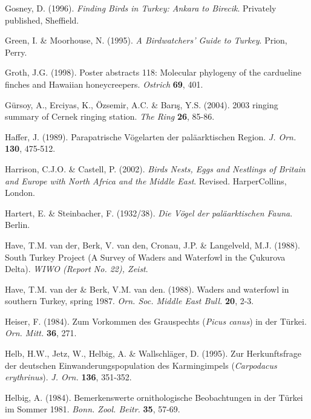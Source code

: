 \documentclass[
  10.5pt,
  a4paper,
  DIV=11,
  numbers=noendperiod,
  twocolumn]{scrreprt}
\newlength{\cslhangindent}
\newenvironment{CSLReferences}[2] %
 {\begin{list}{}{%
  \setlength{\itemindent}{0pt}
  \setlength{\leftmargin}{0pt}
  \setlength{\parsep}{0pt}
  \ifodd #1
   \setlength{\leftmargin}{\cslhangindent}
   \setlength{\itemindent}{-1\cslhangindent}
  \fi
  \setlength{\itemsep}{#2\baselineskip}}}
 {\end{list}}
\begin{document}
\begin{CSLReferences}{1}{1}
Gosney, D. (1996). \emph{{Finding Birds in Turkey: Ankara to Birecik}}.
Privately published, Sheffield.

Green, I. \& Moorhouse, N. (1995). \emph{{A Birdwatchers' Guide to
Turkey}}. Prion, Perry.

Groth, J.G. (1998). {Poster abstracts 118: Molecular phylogeny of the
cardueline finches and Hawaiian honeycreepers}. \emph{Ostrich}
\textbf{69}, 401.

Gürsoy, A., Erciyas, K., Özsemir, A.C. \& Barış, Y.S. (2004). {2003
ringing summary of Cernek ringing station}. \emph{The Ring} \textbf{26},
85-86.

Haffer, J. (1989). {Parapatrische Vögelarten der paläarktischen Region}.
\emph{J. Orn.} \textbf{130}, 475-512.

Harrison, C.J.O. \& Castell, P. (2002). \emph{{Birds Nests, Eggs and
Nestlings of Britain and Europe with North Africa and the Middle East}}.
Revised. HarperCollins, London.

Hartert, E. \& Steinbacher, F. (1932/38). \emph{{Die Vögel der
paläarktischen Fauna}}. Berlin.

Have, T.M. van der, Berk, V. van den, Cronau, J.P. \& Langelveld, M.J.
(1988). {South Turkey Project (A Survey of Waders and Waterfowl in the
Çukurova Delta)}. \emph{WIWO (Report No. 22), Zeist}.

Have, T.M. van der \& Berk, V.M. van den. (1988). {Waders and waterfowl
in southern Turkey, spring 1987}. \emph{Orn. Soc. Middle East Bull.}
\textbf{20}, 2-3.

Heiser, F. (1984). {Zum Vorkommen des Grauspechts (\emph{Picus canus})
in der Türkei}. \emph{Orn. Mitt.} \textbf{36}, 271.

Helb, H.W., Jetz, W., Helbig, A. \& Wallschläger, D. (1995). {Zur
Herkunftsfrage der deutschen Einwanderungspopulation des Karmingimpels
(\emph{Carpodacus erythrinus})}. \emph{J. Orn.} \textbf{136}, 351-352.

Helbig, A. (1984). {Bemerkenswerte ornithologische Beobachtungen in der
Türkei im Sommer 1981}. \emph{Bonn. Zool. Beitr.} \textbf{35}, 57-69.


\end{CSLReferences}
\end{document}
